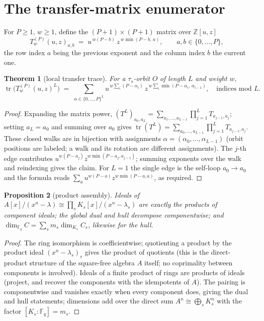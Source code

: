 \documentclass[11pt]{article}
\newtheorem{theorem}{Theorem}[section]
\newtheorem{proposition}[theorem]{Proposition}
\theoremstyle{definition}
\theoremstyle{remark}
\newcommand{\Fq}{\mathbb{F}_q}
\newcommand{\Z}{\mathbb{Z}}
\newcommand{\tr}{\operatorname{tr}}
\begin{document}
\section{The transfer-matrix enumerator}\label{sec:enumerator}

For \(P \ge 1\), \(w \ge 1\), define the \((P{+}1)\times(P{+}1)\) matrix
over \(\Z[u,z]\)
\[
T^{(P)}_w(u,z)_{a,b} \;=\; u^{\,w(P-b)}\, z^{\,w \min(P-b,\, a)},
\qquad a, b \in \{0,\dots,P\},
\]
the row index \(a\) being the previous exponent and the column index
\(b\) the current one.

\begin{theorem}[local transfer trace]\label{thm:T5}
For a \(\tau_s\)-orbit \(O\) of length \(L\) and weight \(w\),
\[
\tr\!\big(T^{(P)}_w(u,z)^L\big)
\;=\; \sum_{\alpha \in \{0,\dots,P\}^L}
u^{\,w \sum_i (P-\alpha_i)}\,
z^{\,w \sum_i \min(P-\alpha_i,\, \alpha_{i-1})},
\quad \text{indices mod } L.
\]
\end{theorem}

\begin{proof}
Expanding the matrix power,
\((T^L)_{a_0,a_L} = \sum_{a_1,\dots,a_{L-1}} \prod_{j=1}^{L} T_{a_{j-1},a_j}\);
setting \(a_L = a_0\) and summing over \(a_0\) gives
\(\tr(T^L) = \sum_{a_0,\dots,a_{L-1}} \prod_{j=1}^{L} T_{a_{j-1},a_j}\).
These closed walks are in bijection with assignments
\(\alpha = (\alpha_0,\dots,\alpha_{L-1})\) (orbit positions are labeled;
a walk and its rotation are different assignments). The \(j\)-th edge
contributes \(u^{w(P-a_j)} z^{w\min(P-a_j, a_{j-1})}\); summing exponents
over the walk and reindexing gives the claim. For \(L=1\) the single edge
is the self-loop \(a_0 \to a_0\) and the formula reads
\(\sum_a u^{w(P-a)} z^{w\min(P-a,a)}\), as required.
\end{proof}

\begin{proposition}[product assembly]\label{prop:assembly}
Ideals of \(A[x]/(x^n-\lambda) \cong \prod_s K_s[x]/(x^n-\lambda_s)\) are
exactly the products of component ideals; the global dual and hull
decompose componentwise; and
\(\dim_{\Fq} C = \sum_s m_s \dim_{K_s} C_s\), likewise for the hull.
\end{proposition}

\begin{proof}
The ring isomorphism is coefficientwise; quotienting a product by the
product ideal \((x^n-\lambda_s)_s\) gives the product of quotients (this
is the direct-product structure of the square-free algebra \(A\) itself;
no coprimality between components is involved). Ideals of a finite
product of rings are products of ideals (project, and recover the
components with the idempotents of \(A\)). The pairing is componentwise
and vanishes exactly when every component does, giving the dual and hull
statements; dimensions add over the direct sum \(A^n \cong \bigoplus_s
K_s^n\) with the factor \([K_s:\Fq] = m_s\).
\end{proof}
\end{document}

